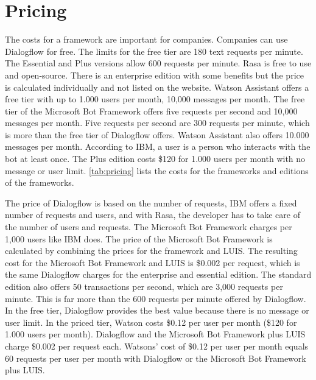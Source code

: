 \section*{Pricing} \label{sec:pricing}
The costs for a framework are important for companies.
Companies can use Dialogflow for free.
The limits for the free tier are 180 text requests per minute.
The Essential and Plus versions allow 600 requests per minute.
Rasa is free to use and open-source.
There is an enterprise edition with some benefits but the price
is calculated individually and not listed on the website.
Watson Assistant offers a free tier with up to 1.000 users per month, 
10,000 messages per month.
The free tier of the Microsoft Bot Framework offers five requests per second and 10,000 messages per month. 
Five requests per second are 300 requests per minute, which is more than the free tier of Dialogflow offers.
Watson Assistant also offers 10.000 messages per month.
According to IBM, a user is a person who interacts with the bot at least once.
The Plus edition costs \$120 for 1.000 users per month with
no message or user limit.
\ref{tab:pricing} lists the costs for the frameworks and editions of the frameworks.

The price of Dialogflow is based on the number of requests, IBM offers a fixed number of requests and users, and with Rasa, the developer has to take care of the number of users and requests.
The Microsoft Bot Framework charges per 1,000 users like IBM does.
The price of the Microsoft Bot Framework is calculated by combining the prices for the framework and LUIS.
The resulting cost for the Microsoft Bot Framework and LUIS is \$0.002 per request, which is the same Dialogflow charges for the enterprise and essential edition.  
The standard edition also offers 50 transactions per second, which are 3,000 requests per minute.
This is far more than the 600 requests per minute offered by Dialogflow.
In the free tier, Dialogflow provides the best value because there is no message or user limit.
In the priced tier, Watson costs \$0.12 per user per month (\$120 for 1.000 users per month).
Dialogflow and the Microsoft Bot Framework plus LUIS charge \$0.002 per request each.
Watsons' cost of \$0.12 per user per month equals 60 requests per user per month with Dialogflow or the Microsoft Bot Framework plus LUIS.


